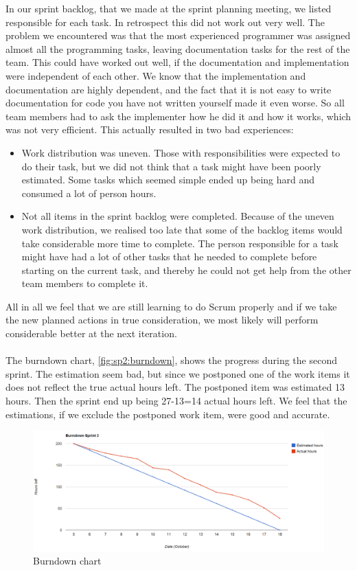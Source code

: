 In our sprint backlog, that we made at the sprint planning meeting, we listed responsible for each task. In retrospect this did not work out very well. The problem we encountered was that the most experienced programmer was assigned almost all the programming tasks, leaving documentation tasks for the rest of the team. This could have worked out well, if the documentation and implementation were independent of each other. We know that the implementation and documentation are highly dependent, and the fact that it is not easy to write documentation for code you have not written yourself made it even worse. So all team members had to ask the implementer how he did it and how it works, which was not very efficient. 
This actually resulted in two bad experiences:
\begin{itemize}
\item Work distribution was uneven. Those with responsibilities were expected to do their task, but we did not think that a task might have been poorly estimated. Some tasks which seemed simple ended up being hard and consumed a lot of person hours.
\item Not all items in the sprint backlog were completed. Because of the uneven work distribution, we realised too late that some of the backlog items would take considerable more time to complete. The person responsible for a task might have had a lot of other tasks that he needed to complete before starting on the current task, and thereby he could not get help from the other team members to complete it.
\end{itemize} 
 All in all we feel that we are still learning to do Scrum properly and if we take the new planned actions in true consideration, we most likely will perform considerable better at the next iteration. 
\\
\\
The burndown chart, \autoref{fig:sp2:burndown}, shows the progress during the second sprint. The estimation seem bad, but since we postponed one of the work items it does not reflect the true actual hours left. The postponed item was estimated 13 hours. Then the sprint end up being 27-13=14 actual hours left. We feel that the estimations, if we exclude the postponed work item, were good and accurate.
\begin{figure}[!htb]
	\includegraphics[width=\textwidth]{./sprints/img/burndown_chart_s2}
	\caption{Burndown chart\label{fig:sp2:burndown}}
\end{figure}



